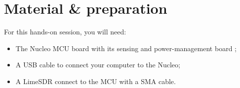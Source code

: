 \section*{Material \& preparation}

\begin{comment}[couleur = gray!20, arrondi = 0.2, logo=\bcinfo]{}
\vspace{0.2cm}
\end{comment}
For this hands-on session, you will need:
\begin{itemize}
    \item The Nucleo MCU board with its sensing and power-management board ;
    \item A USB cable to connect your computer to the Nucleo;
    \item A LimeSDR connect to the MCU with a SMA cable.
\end{itemize}
